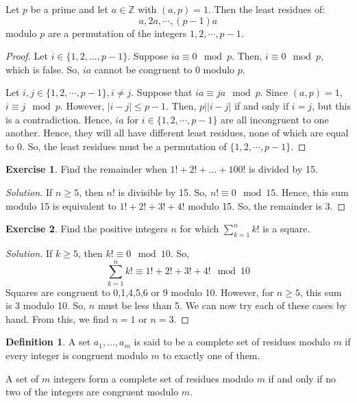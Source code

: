 \documentclass[12pt,letterpaper]{book}
\theoremstyle{definition}
\newtheorem{definition}{Definition} %
\newtheorem*{exercise}{Exercise}
\newenvironment{solution}
  {\renewcommand\qedsymbol{$\blacksquare$}\begin{proof}[Solution]}
  {\end{proof}}
\newcommand{\Z}{\mathbb{Z}}
\begin{document}
\begin{lemma}
  Let $p$ be a prime and let $a \in \Z$ with $(a,p) = 1$. Then the least residues of:
  \[a, 2a, \cdots, (p-1)a\]
  modulo $p$ are a permutation of the integers $1,2,\cdots, p-1$.
\end{lemma}
\begin{proof}
  Let $i \in \{1,2,...,p-1\}$. Suppose $ia \equiv 0 \mod p$. Then, $i \equiv 0 \mod p$, which is false. So, $ia$ cannot be congruent to 0 modulo $p$.

  Let $i,j \in \{1,2,\cdots, p-1\}, i \neq j$. Suppose that $ia \equiv ja \mod p$. Since $(a,p) = 1$, $i \equiv j \mod p$. However, $|i-j| \leq p-1$. Then, $p||i-j|$ if and only if $i=j$, but this is a contradiction. Hence, $ia$ for $i \in \{1,2,\cdots, p-1\}$ are all incongruent to one another. Hence, they will all have different least residues, none of which are equal to 0. So, the least residues must be a permutation of $\{1,2, \cdots, p-1\}$.
\end{proof}

\begin{exercise}
  Find the remainder when $1!+2!+...+100!$ is divided by 15.
\end{exercise}
\begin{solution}
  If $n \geq 5$, then $n!$ is divisible by 15. So, $n! \equiv 0 \mod 15$. Hence, this sum modulo 15 is equivalent to $1!+2!+3!+4!$ modulo 15. So, the remainder is 3.
\end{solution}
\begin{exercise}
  Find the positive integers $n$ for which $\sum_{k=1}^n k!$ is a square.
\end{exercise}
\begin{solution}
  If $k \geq 5$, then $k! \equiv 0 \mod 10$. So,
  \[\sum_{k=1}^n k! \equiv 1!+2!+3!+4! \mod 10\]
  Squares are congruent to 0,1,4,5,6 or 9 modulo 10. However, for $n \geq 5$, this sum is 3 modulo 10. So, $n$ must be less than 5. We can now try each of these cases by hand. From this, we find $n=1$ or $n=3$.
\end{solution}

\begin{definition}
  A set $a_1,...,a_m$ is said to be a complete set of residues modulo $m$ if every integer is congruent modulo $m$ to exactly one of them.
\end{definition}

A set of $m$ integers form a complete set of residues modulo $m$ if and only if no two of the integers are congruent modulo $m$.
\end{document}
